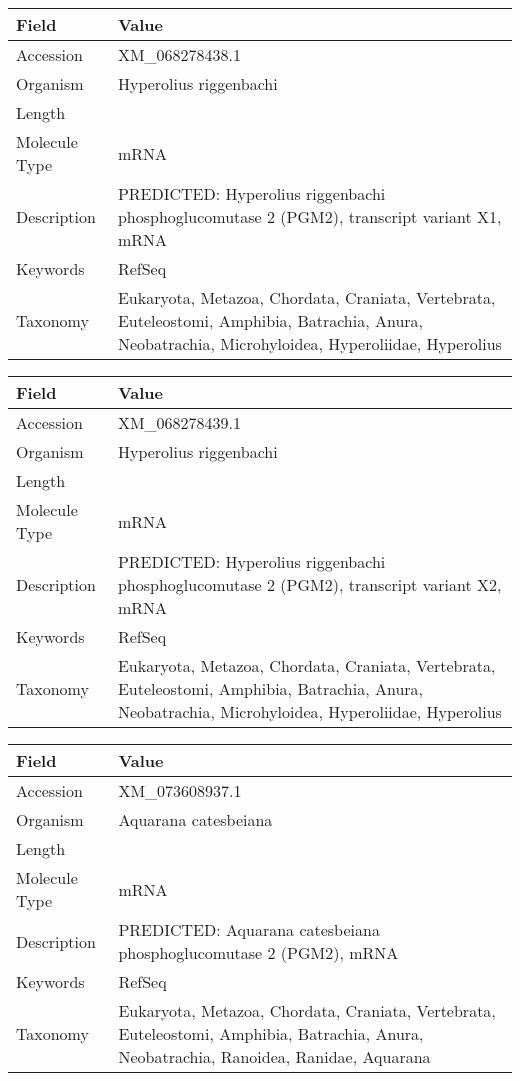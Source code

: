 \documentclass[10pt]{article}
\begin{document}
{\footnotesize
\begin{longtable}{>{\raggedright\arraybackslash}p{4.5cm} >{\raggedright\arraybackslash}p{11.5cm}}
\textbf{Field} & \textbf{Value} \\
\hline
Accession & XM\_068278438.1 \\
Organism & Hyperolius riggenbachi \\
Length & 3838 \\
Molecule Type & mRNA \\
Description & PREDICTED: Hyperolius riggenbachi phosphoglucomutase 2 (PGM2), transcript variant X1, mRNA \\
Keywords & RefSeq \\
Taxonomy & Eukaryota, Metazoa, Chordata, Craniata, Vertebrata, Euteleostomi, Amphibia, Batrachia, Anura, Neobatrachia, Microhyloidea, Hyperoliidae, Hyperolius \\
\end{longtable}
}

{\footnotesize
\begin{longtable}{>{\raggedright\arraybackslash}p{4.5cm} >{\raggedright\arraybackslash}p{11.5cm}}
\textbf{Field} & \textbf{Value} \\
\hline
Accession & XM\_068278439.1 \\
Organism & Hyperolius riggenbachi \\
Length & 3761 \\
Molecule Type & mRNA \\
Description & PREDICTED: Hyperolius riggenbachi phosphoglucomutase 2 (PGM2), transcript variant X2, mRNA \\
Keywords & RefSeq \\
Taxonomy & Eukaryota, Metazoa, Chordata, Craniata, Vertebrata, Euteleostomi, Amphibia, Batrachia, Anura, Neobatrachia, Microhyloidea, Hyperoliidae, Hyperolius \\
\end{longtable}
}

{\footnotesize
\begin{longtable}{>{\raggedright\arraybackslash}p{4.5cm} >{\raggedright\arraybackslash}p{11.5cm}}
\textbf{Field} & \textbf{Value} \\
\hline
Accession & XM\_073608937.1 \\
Organism & Aquarana catesbeiana \\
Length & 3149 \\
Molecule Type & mRNA \\
Description & PREDICTED: Aquarana catesbeiana phosphoglucomutase 2 (PGM2), mRNA \\
Keywords & RefSeq \\
Taxonomy & Eukaryota, Metazoa, Chordata, Craniata, Vertebrata, Euteleostomi, Amphibia, Batrachia, Anura, Neobatrachia, Ranoidea, Ranidae, Aquarana \\
\end{longtable}
}
\end{document}
